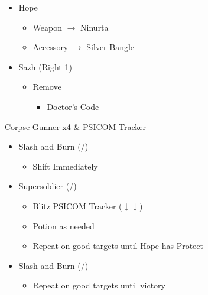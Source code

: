 \begin{menu}
\begin{itemize}
    \equip
    \begin{itemize}
        \item Hope
        \begin{itemize}
                \item Weapon $\rightarrow$ Ninurta
                \item Accessory $\rightarrow$ Silver Bangle
        \end{itemize}
        \item Sazh (Right 1)
        \begin{itemize}
            \item Remove
            \begin{itemize}
                \item Doctor's Code
            \end{itemize}
        \end{itemize}
    \end{itemize}
\end{itemize}
\end{menu}

\renewcommand{\first}{[1] Slash and Burn (\com/\rav)}
\renewcommand{\second}{[2] Supersoldier (\com/\syn)}

\begin{battle}{Corpse Gunner x4 \& PSICOM Tracker}
\begin{itemize}
    \item \first
    \begin{itemize}
        \item Shift Immediately
    \end{itemize}
    \item \second
    \begin{itemize}
        \item Blitz PSICOM Tracker ($\downarrow\downarrow$)
        \item Potion as needed
        \item Repeat on good targets until Hope has Protect
    \end{itemize}
    \item \first
    \begin{itemize}
        \item Repeat on good targets until victory
    \end{itemize}
\end{itemize}
 
\end{battle}

